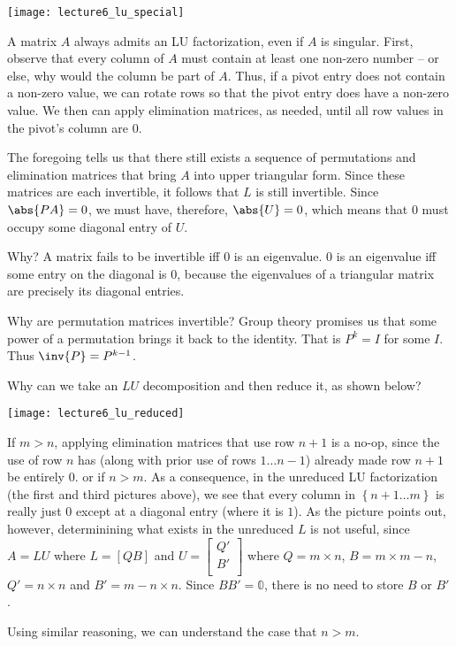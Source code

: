 \documentclass[../main.tex]{subfiles}
\begin{document}
\begin{remark}
    \begin{center}
        \texttt{[image: lecture6\_lu\_special]}
    \end{center}

    A matrix $A$ always admits an LU factorization, even if $A$
    is singular. First, observe that every column of $A$ must contain
    at least one non-zero number -- or else, why would the column
    be part of $A$. Thus, if a pivot entry does not contain a non-zero
    value, we can rotate rows so that the pivot entry does have
    a non-zero value. We then can apply elimination matrices, as needed,
    until all row values in the pivot's column are $0$. 

    The foregoing tells us that there still exists a sequence of
    permutations and elimination matrices that bring $A$ into upper
    triangular form. Since these matrices are each invertible, it follows that $L$ is still invertible. Since $\abs{PA} = 0$, we must have, therefore, $\abs{U} = 0$, which means that $0$ must occupy some diagonal entry of $U$.

    Why? A matrix fails to be invertible iff $0$ is an eigenvalue. $0$ is an eigenvalue iff some entry on the diagonal is $0$, because the eigenvalues of a triangular matrix are precisely its diagonal entries.

    Why are permutation matrices invertible? Group theory promises us that some power of a permutation brings it back to the identity. That is $P^k = I$ for some $I$. Thus $\inv{P} = P^{k-1}$.
\end{remark}

\begin{remark}
    Why can we take an $LU$ decomposition and then reduce it, as shown below?
    \begin{center}
        \texttt{[image: lecture6\_lu\_reduced]}
    \end{center}

    If $m > n$, applying elimination matrices that use row $n+1$ is a no-op, since the use of row $n$ has (along with prior use of rows $1 \dots n-1$) already made row $n+1$ be entirely $0$. or if $n > m$. As a consequence, in the unreduced LU factorization (the first and third pictures above), we see that every column in $\left\{ n+1 \dots m \right\}$ is really just $0$ except at a diagonal entry (where it is $1$). As the picture points out, however, determinining what exists in the unreduced $L$ is not useful, since $A = LU$ where $L = [Q B]$ and $U = \begin{bmatrix}
        Q' \\
        B' \\
    \end{bmatrix}$ where $Q = m \times n$, $B = m \times m-n$, $Q' = n \times n$ and $B' = m -n \times n$. Since $BB' = \mathbb{0}$, there is no need to store $B$ or $B'$.

    Using similar reasoning, we can understand the case that $n > m$.
\end{remark}
\end{document}
